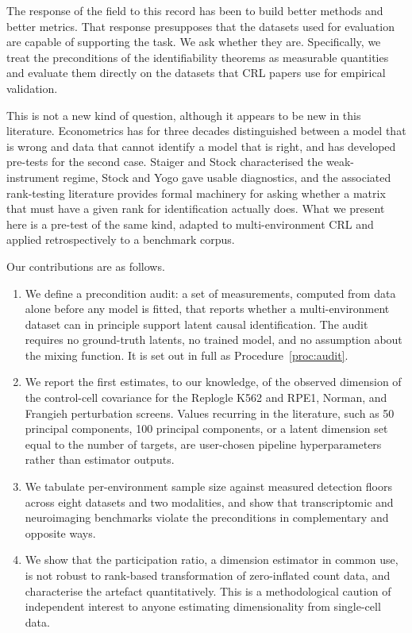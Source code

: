 \documentclass[journal,twoside,web]{ieeecolor}
\begin{document}
The response of the field to this record has been to build better methods and
better metrics. That response presupposes that the datasets used for
evaluation are capable of supporting the task. We ask whether they are.
Specifically, we treat the preconditions of the identifiability theorems as
measurable quantities and evaluate them directly on the datasets that CRL
papers use for empirical validation.

This is not a new kind of question, although it appears to be new in this
literature. Econometrics has for three decades distinguished between a model
that is wrong and data that cannot identify a model that is right, and has
developed pre-tests for the second case. Staiger and Stock \cite{staiger1997}
characterised the weak-instrument regime, Stock and Yogo \cite{stock2005} gave
usable diagnostics, and the associated rank-testing literature
\cite{kleibergen2006,robin2000,chen2019} provides formal machinery for asking
whether a matrix that must have a given rank for identification actually does.
What we present here is a pre-test of the same kind, adapted to
multi-environment CRL and applied retrospectively to a benchmark corpus.

Our contributions are as follows.

\begin{enumerate}
\item We define a precondition audit: a set of measurements, computed from
data alone before any model is fitted, that reports whether a
multi-environment dataset can in principle support latent causal
identification. The audit requires no ground-truth latents, no trained model,
and no assumption about the mixing function. It is set out in full as
Procedure~\ref{proc:audit}.

\item We report the first estimates, to our knowledge, of the observed
dimension of the control-cell covariance for the Replogle K562 and RPE1,
Norman, and Frangieh perturbation screens. Values recurring in the literature,
such as 50 principal components, 100 principal components, or a latent
dimension set equal to the number of targets, are user-chosen pipeline
hyperparameters rather than estimator outputs.

\item We tabulate per-environment sample size against measured detection
floors across eight datasets and two modalities, and show that transcriptomic
and neuroimaging benchmarks violate the preconditions in complementary and
opposite ways.

\item We show that the participation ratio, a dimension estimator in common
use, is not robust to rank-based transformation of zero-inflated count data,
and characterise the artefact quantitatively. This is a methodological caution
of independent interest to anyone estimating dimensionality from single-cell
data.
\end{enumerate}
\end{document}
